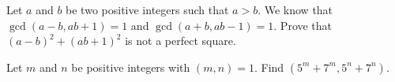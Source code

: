 \documentclass{subfile}
\begin{document}
	\begin{problem}
		Let $a$ and $b$ be two positive integers such that $a>b$. We know that $\gcd(a-b,ab+1)=1$ and $\gcd(a+b,ab-1)=1$. Prove that $(a-b)^2+(ab+1)^2$ is not a perfect square. %
	\end{problem}

%
%
%
%
%
%
%
%
%
%
%
%
%

	\begin{problem}
		Let $m$ and $n$ be positive integers with $(m,n)=1$. Find $(5^m+7^m,5^n+7^n)$. %
	\end{problem}
\end{document}
